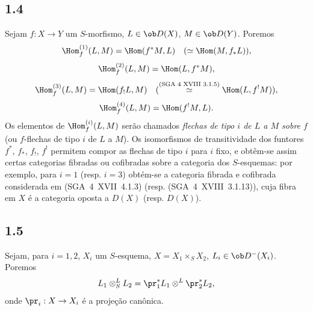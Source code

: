 \subsection*{1.4}
Sejam $f:X\to Y$ um $S$-morfismo, $L\in\ob D(X)$, $M\in\ob D(Y)$. Poremos
\[
\Hom_f^{(1)}(L,M)=\Hom(f^{*}M,L)\quad (\simeq \Hom(M,f_{*}L)),
\]
\[
\Hom_f^{(2)}(L,M)=\Hom(L,f^{*}M),
\]
\[
\Hom_f^{(3)}(L,M)=\Hom(f_{!}L,M)\quad (\overset{\text{(SGA~4~XVIII~3.1.5)}}{\simeq} \Hom(L,f^{!}M)),
\]
\[
\Hom_f^{(4)}(L,M)=\Hom(f^{!}M,L).
\]
Os elementos de $\Hom_f^{(i)}(L,M)$ serão chamados \emph{flechas de tipo $i$ de $L$ a $M$ sobre $f$} (ou $f$-flechas de tipo $i$ de $L$ a $M$). Os isomorfismos de transitividade dos funtores $f^{*}$, $f_{*}$, $f_{!}$, $f^{!}$ permitem compor as flechas de tipo $i$ para $i$ fixo, e obtêm-se assim certas categorias fibradas ou cofibradas sobre a categoria dos $S$-esquemas: por exemplo, para $i=1$ (resp. $i=3$) obtém-se a categoria fibrada e cofibrada considerada em (SGA~4~XVII~4.1.3) (resp. (SGA~4~XVIII~3.1.13)), cuja fibra em $X$ é a categoria oposta a $D(X)$ (resp. $D(X)$).

\subsection*{1.5}
Sejam, para $i=1,2$, $X_i$ um $S$-esquema, $X=X_1\times_S X_2$, $L_i\in\ob D^{-}(X_i)$. Poremos
\[
L_1\otimes^{L}_{S}L_2=\pr_1^{*}L_1\otimes^{L}\pr_2^{*}L_2,
\]
onde $\pr_i:X\to X_i$ é a projeção canônica.

